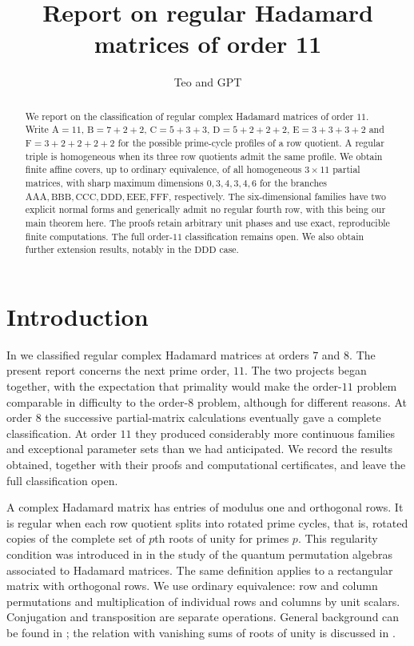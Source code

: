 \documentclass[11pt,a4paper]{article}
\title{Report on regular Hadamard matrices of order 11}
\author{Teo and GPT}
\date{}
\theoremstyle{plain}
\theoremstyle{definition}
\theoremstyle{plain}
\begin{document}
\maketitle
\begin{abstract}
We report on the classification of regular complex Hadamard matrices of order $11$. Write $\mathrm A=11$, $\mathrm B=7+2+2$, $\mathrm C=5+3+3$, $\mathrm D=5+2+2+2$, $\mathrm E=3+3+3+2$ and $\mathrm F=3+2+2+2+2$ for the possible prime-cycle profiles of a row quotient. A regular triple is homogeneous when its three row quotients admit the same profile. We obtain finite affine covers, up to ordinary equivalence, of all homogeneous $3\times11$ partial matrices, with sharp maximum dimensions $0,3,4,3,4,6$ for the branches $\mathrm{AAA},\mathrm{BBB},\mathrm{CCC},\mathrm{DDD},\mathrm{EEE},\mathrm{FFF}$, respectively. The six-dimensional families have two explicit normal forms and generically admit no regular fourth row, with this being our main theorem here. The proofs retain arbitrary unit phases and use exact, reproducible finite computations. The full order-$11$ classification remains open. We also obtain further extension results, notably in the $\mathrm{DDD}$ case.
\end{abstract}
\begingroup
\setlength{\parskip}{0pt}
\makeatletter
\patchcmd{\l@section}{\addvspace{1.0em \@plus\p@}}{\addvspace{0pt}}{}{}
\makeatother
\hypersetup{linkcolor=magenta}
\tableofcontents
\endgroup
\section*{Introduction}

In \cite{regular78} we classified regular complex Hadamard matrices at orders $7$ and $8$. The present report concerns the next prime order, $11$. The two projects began together, with the expectation that primality would make the order-$11$ problem comparable in difficulty to the order-$8$ problem, although for different reasons. At order $8$ the successive partial-matrix calculations eventually gave a complete classification. At order $11$ they produced considerably more continuous families and exceptional parameter sets than we had anticipated. We record the results obtained, together with their proofs and computational certificates, and leave the full classification open.

A complex Hadamard matrix has entries of modulus one and orthogonal rows. It is regular when each row quotient splits into rotated prime cycles, that is, rotated copies of the complete set of $p$th roots of unity for primes $p$. This regularity condition was introduced in \cite{bbs} in the study of the quantum permutation algebras associated to Hadamard matrices. The same definition applies to a rectangular matrix with orthogonal rows. We use ordinary equivalence: row and column permutations and multiplication of individual rows and columns by unit scalars. Conjugation and transposition are separate operations. General background can be found in \cite{inv,tz1}; the relation with vanishing sums of roots of unity is discussed in \cite{lle}.
\end{document}
